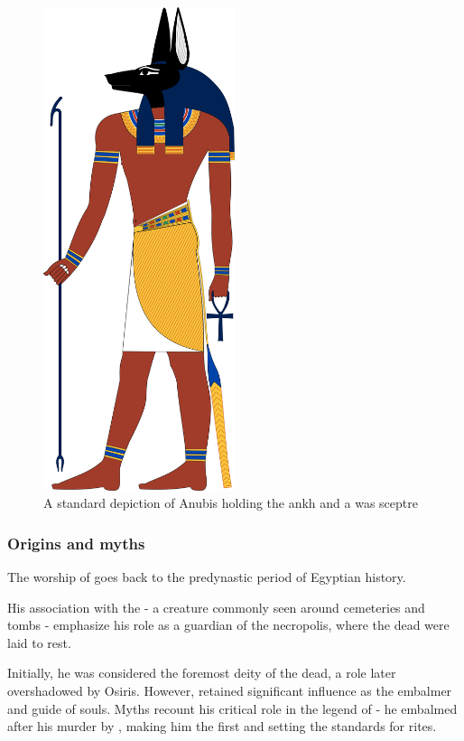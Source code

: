 \begin{figure} [H]
	\centering
	\includegraphics[width=0.5\textwidth]{../images/anubis}
	\caption{A standard depiction of Anubis holding the ankh and a was sceptre}
\end{figure}

\subsubsection*{Origins and myths}
The worship of  goes back to the predynastic period of Egyptian history.

His association with the  - a creature commonly seen around cemeteries and tombs - emphasize his role as a guardian of the necropolis, where the dead were laid to rest.

Initially, he was considered the foremost deity of the dead, a role later overshadowed by Osiris. However,  retained significant influence as the embalmer and guide of souls. Myths recount his critical role in the legend of  - he embalmed  after his murder by , making him the first  and setting the standards for  rites.

